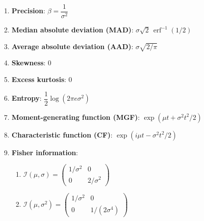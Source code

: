 \begin{enumerate}
    \item
    \textbf{Precision}: $\beta = \dfrac{1}{\sigma^2}$
    \hfill \cite{ml/book/Pattern-Recognition-And-Machine-Learning/Christopher-M-Bishop}

    \item
    \textbf{Median absolute deviation (MAD)}:
    $ {\displaystyle \sigma {\sqrt {2}}\,\operatorname {erf} ^{-1}(1/2)} $
    \hfill\cite{wiki/Normal_distribution}

    \item
    \textbf{Average absolute deviation (AAD)}:
    $ {\textstyle \sigma {\sqrt {2/\pi }}} $
    \hfill\cite{wiki/Normal_distribution}

    \item
    \textbf{Skewness}: $0$
    \hfill\cite{wiki/Normal_distribution}

    \item
    \textbf{Excess kurtosis}: $0$
    \hfill\cite{wiki/Normal_distribution}

    \item
    \textbf{Entropy}: $ {\textstyle {\dfrac {1}{2}}\log(2\pi e\sigma ^{2})} $
    \hfill\cite{wiki/Normal_distribution}

    \item
    \textbf{Moment-generating function (MGF)}: $ {\displaystyle \exp(\mu t+\sigma ^{2}t^{2}/2)} $
    \hfill\cite{wiki/Normal_distribution}

    \item
    \textbf{Characteristic function (CF)}: $ {\displaystyle \exp(i\mu t-\sigma ^{2}t^{2}/2)} $
    \hfill\cite{wiki/Normal_distribution}

    \item
    \textbf{Fisher information}:
    \begin{enumerate}
        \item ${\displaystyle {\mathcal {I}}(\mu ,\sigma )={\begin{pmatrix}1/\sigma ^{2}&0\\0&2/\sigma ^{2}\end{pmatrix}}}$

        \item ${\displaystyle {\mathcal {I}}(\mu ,\sigma ^{2})={\begin{pmatrix}1/\sigma ^{2}&0\\0&1/(2\sigma ^{4})\end{pmatrix}}}$
    \end{enumerate}
    \hfill\cite{wiki/Normal_distribution}


\end{enumerate}
